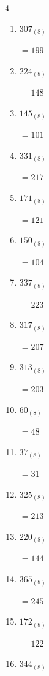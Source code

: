 \begin{multicols}{4}
\begin{enumerate}
        $=18$

  \item $307_{(8)}$

        $=199$

  \item $224_{(8)}$

        $=148$

  \item $145_{(8)}$

        $=101$

  \item $331_{(8)}$

        $=217$

  \item $171_{(8)}$

        $=121$

  \item $150_{(8)}$

        $=104$

  \item $337_{(8)}$

        $=223$

  \item $317_{(8)}$

        $=207$

  \item $313_{(8)}$

        $=203$

  \item $60_{(8)}$

        $=48$

  \item $37_{(8)}$

        $=31$

  \item $325_{(8)}$

        $=213$

\columnbreak %

\resetques

  \item $220_{(8)}$

        $=144$

  \item $365_{(8)}$

        $=245$

  \item $172_{(8)}$

        $=122$

  \item $344_{(8)}$


\end{enumerate}
\end{multicols}
